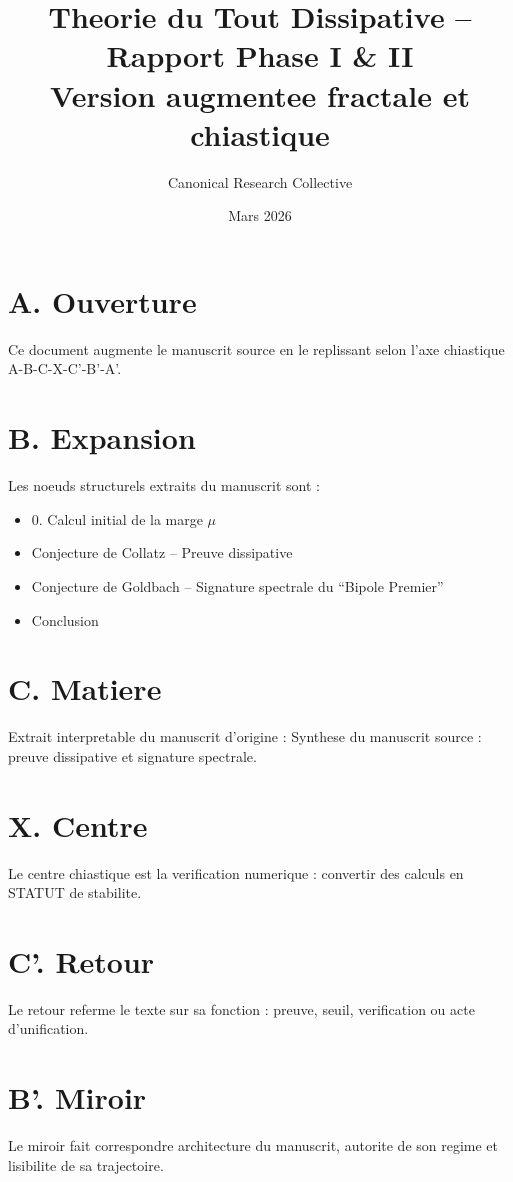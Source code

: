 ﻿\documentclass[11pt,a4paper]{article}
\title{Theorie du Tout Dissipative -- Rapport Phase I \& II \\ \large Version augmentee fractale et chiastique}
\author{Canonical Research Collective}
\date{Mars 2026}
\begin{document}
\maketitle

\section*{A. Ouverture}
Ce document augmente le manuscrit source en le replissant selon l'axe chiastique A-B-C-X-C'-B'-A'.

\section*{B. Expansion}
Les noeuds structurels extraits du manuscrit sont :
\begin{itemize}[leftmargin=1.2cm]
\item 0. Calcul initial de la marge $\mu$
\item Conjecture de Collatz -- Preuve dissipative
\item Conjecture de Goldbach -- Signature spectrale du ``Bipole Premier''
\item Conclusion
\end{itemize}

\section*{C. Matiere}
Extrait interpretable du manuscrit d'origine :
Synthese du manuscrit source : preuve dissipative et signature spectrale.

\section*{X. Centre}
Le centre chiastique est la verification numerique : convertir des calculs en STATUT de stabilite.

\section*{C'. Retour}
Le retour referme le texte sur sa fonction : preuve, seuil, verification ou acte d'unification.

\section*{B'. Miroir}
Le miroir fait correspondre architecture du manuscrit, autorite de son regime et lisibilite de sa trajectoire.
\end{document}
